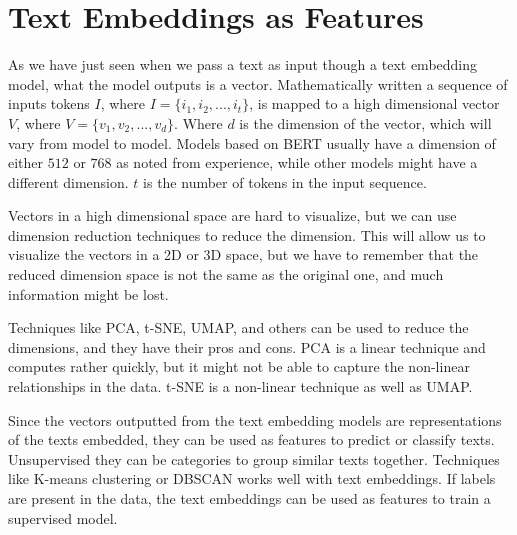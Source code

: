 \section{Text Embeddings as Features}

As we have just seen when we pass a text as input though a 
text embedding model, what the model outputs is a vector.
Mathematically written a sequence of inputs tokens $I$, 
where $I = \{i_1, i_2, ..., i_t\}$, is mapped to a high dimensional 
vector $V$, where $V = \{v_1, v_2, ..., v_d\}$.
Where $d$ is the dimension of the vector, which will vary from model
to model. Models based on BERT usually have a dimension of either 
$512$ or $768$ as noted from experience, while other models might have
a different dimension. $t$ is the number of tokens in the input sequence.
 
Vectors in a high dimensional space are hard to visualize, but
we can use dimension reduction techniques to reduce the dimension.
This will allow us to visualize the vectors in a 2D or 3D space, but 
we have to remember that the reduced dimension space is not the same as
the original one, and much information might be lost. 

Techniques like PCA, t-SNE, UMAP, and others can be used to reduce the 
dimensions, and they have their pros and cons. PCA is a linear technique
and computes rather quickly, but it might not be able to capture the
non-linear relationships in the data. t-SNE is a non-linear technique as well as UMAP.

Since the vectors outputted from the text embedding models are 
representations of the texts embedded, they can be used as features to 
predict or classify texts. Unsupervised they can be categories 
to group similar texts together. Techniques like K-means clustering or
DBSCAN works well with text embeddings. If labels are present in the data, the text embeddings can be used as features
to train a supervised model.